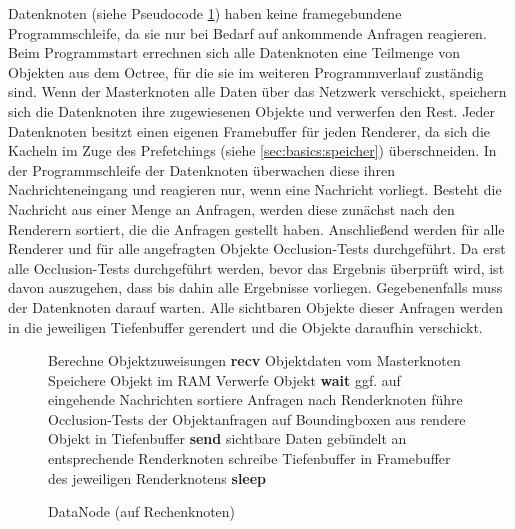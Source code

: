 Datenknoten (siehe Pseudocode \ref{alg:impl:datanode}) haben keine framegebundene Programmschleife, da sie nur bei Bedarf auf ankommende Anfragen reagieren. Beim Programmstart errechnen sich alle Datenknoten eine Teilmenge von Objekten aus dem Octree, für die sie im weiteren Programmverlauf zuständig sind. Wenn der Masterknoten alle Daten über das Netzwerk verschickt, speichern sich die Datenknoten ihre zugewiesenen Objekte und verwerfen den Rest. Jeder Datenknoten besitzt einen eigenen Framebuffer für jeden Renderer, da sich die Kacheln im Zuge des Prefetchings (siehe \ref{sec:basics:speicher}) überschneiden. In der Programmschleife der Datenknoten überwachen diese ihren Nachrichteneingang und reagieren nur, wenn eine Nachricht vorliegt. Besteht die Nachricht aus einer Menge an Anfragen, werden diese zunächst nach den Renderern sortiert, die die Anfragen gestellt haben. Anschließend werden für alle Renderer und für alle angefragten Objekte Occlusion-Tests durchgeführt. Da erst alle Occlusion-Tests durchgeführt werden, bevor das Ergebnis überprüft wird, ist davon auszugehen, dass bis dahin alle Ergebnisse vorliegen. Gegebenenfalls muss der Datenknoten darauf warten. Alle sichtbaren Objekte dieser Anfragen werden in die jeweiligen Tiefenbuffer gerendert und die Objekte daraufhin verschickt.
\begin{figure}[ttt!]
\centering
 \begin{minipage}[t]{12cm}
\begin{algorithm}[H]
  \caption{DataNode (auf Rechenknoten)\label{alg:impl:datanode}} 
    \begin{algorithmic} [1]
      \STATE Berechne Objektzuweisungen
      \STATE \textbf{recv} Objektdaten vom Masterknoten
	\STATE Speichere Objekt im RAM
      \ELSE
	\STATE Verwerfe Objekt
      \ENDIF
	\STATE \textbf{wait} ggf. auf eingehende Nachrichten
	  \STATE sortiere Anfragen nach Renderknoten
	    \STATE führe Occlusion-Tests der Objektanfragen auf Boundingboxen aus
	  \ENDFOR
	    \STATE rendere Objekt in Tiefenbuffer
 	  \ENDFOR
	  \STATE \textbf{send} sichtbare Daten gebündelt an entsprechende Renderknoten
	  \STATE schreibe Tiefenbuffer in Framebuffer des jeweiligen Renderknotens
	\ELSE \STATE\textbf{sleep}
	\ENDIF
      \ENDWHILE
    \end{algorithmic}
\end{algorithm}
 \end{minipage}
\end{figure}

